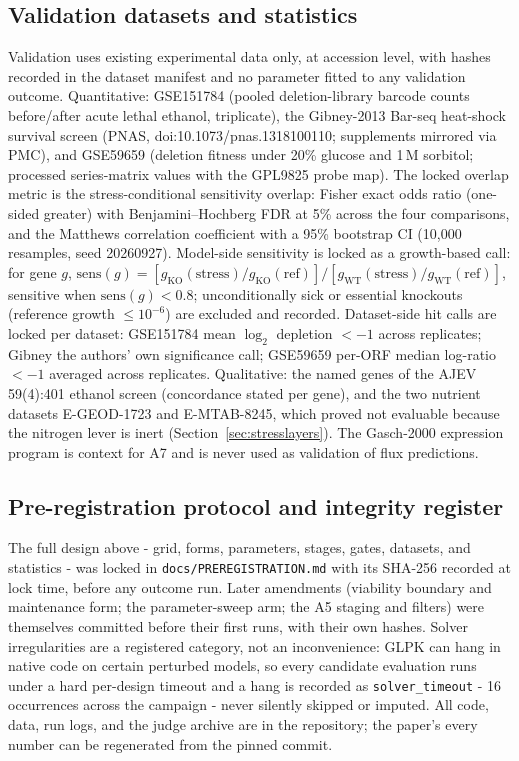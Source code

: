 \documentclass[12pt]{article}
\begin{document}
\subsection{Validation datasets and statistics}
\label{sec:datasets}

Validation uses existing experimental data only, at accession level, with
hashes recorded in the dataset manifest and no parameter fitted to any
validation outcome. Quantitative: GSE151784 (pooled deletion-library
barcode counts before/after acute lethal ethanol, triplicate), the
Gibney-2013 Bar-seq heat-shock survival screen (PNAS,
doi:10.1073/pnas.1318100110; supplements mirrored via PMC), and GSE59659
(deletion fitness under 20\% glucose and 1\,M sorbitol; processed
series-matrix values with the GPL9825 probe map). The locked overlap
metric is the stress-conditional sensitivity overlap: Fisher exact odds
ratio (one-sided greater) with Benjamini--Hochberg FDR at 5\% across the
four comparisons, and the Matthews correlation coefficient with a 95\%
bootstrap CI (10{,}000 resamples, seed 20260927). Model-side sensitivity
is locked as a growth-based call: for gene $g$,
$\mathrm{sens}(g)=[g_{\mathrm{KO}}(\mathrm{stress})/
g_{\mathrm{KO}}(\mathrm{ref})]/[g_{\mathrm{WT}}(\mathrm{stress})/
g_{\mathrm{WT}}(\mathrm{ref})]$, sensitive when $\mathrm{sens}(g)<0.8$;
unconditionally sick or essential knockouts (reference growth
$\le 10^{-6}$) are excluded and recorded. Dataset-side hit calls are
locked per dataset: GSE151784 mean $\log_2$ depletion $<-1$ across
replicates; Gibney the authors' own significance call; GSE59659 per-ORF
median log-ratio $<-1$ averaged across replicates. Qualitative: the named
genes of the AJEV 59(4):401 ethanol screen (concordance stated per gene),
and the two nutrient datasets E-GEOD-1723 and E-MTAB-8245, which proved
not evaluable because the nitrogen lever is inert
(Section~\ref{sec:stresslayers}). The Gasch-2000 expression program is
context for A7 and is never used as validation of flux predictions.

\subsection{Pre-registration protocol and integrity register}

The full design above - grid, forms, parameters, stages, gates,
datasets, and statistics - was locked in \texttt{docs/PREREGISTRATION.md}
with its SHA-256 recorded at lock time, before any outcome run. Later
amendments (viability boundary and maintenance form; the parameter-sweep
arm; the A5 staging and filters) were themselves committed before their
first runs, with their own hashes. Solver irregularities are a registered
category, not an inconvenience: GLPK can hang in native code on certain
perturbed models, so every candidate evaluation runs under a hard
per-design timeout and a hang is recorded as \texttt{solver\_timeout} -
16 occurrences across the campaign - never silently skipped or imputed.
All code, data, run logs, and the judge archive are in the repository;
the paper's every number can be regenerated from the pinned commit.
\end{document}
